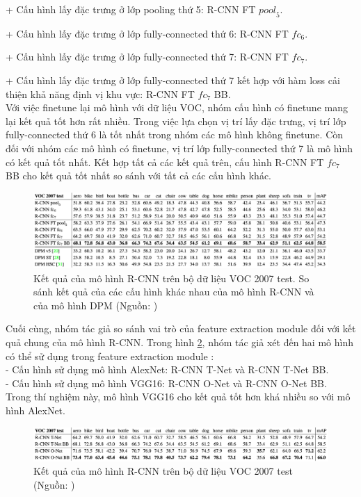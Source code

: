 {    + Cấu hình lấy đặc trưng ở lớp pooling thứ 5: R-CNN FT ${pool}_{5}$. \par
    + Cấu hình lấy đặc trưng ở lớp fully-connected thứ 6: R-CNN FT ${fc}_{6}$. \par
    + Cấu hình lấy đặc trưng ở lớp fully-connected thứ 7: R-CNN FT ${fc}_{7}$. \par
    + Cấu hình lấy đặc trưng ở lớp fully-connected thứ 7 kết hợp với hàm loss cải thiện khả năng định vị khu vực: R-CNN FT ${fc}_{7}$ BB. \\
    Với việc finetune lại mô hình với dữ liệu VOC, nhóm cấu hình có finetune mang lại kết quả tốt hơn rất nhiều.
    Trong việc lựa chọn vị trí lấy đặc trưng, vị trí lớp fully-connected thứ 6 là tốt nhất trong nhóm các mô hình không finetune.
    Còn đối với nhóm các mô hình có finetune, vị trí lớp fully-connected thứ 7 là mô hình có kết quả tốt nhất.
    Kết hợp tất cả các kết quả trên, cấu hình R-CNN FT ${fc}_{7}$ BB cho kết quả tốt nhất so sánh với tất cả các cấu hình khác.
    \begin{figure}[H]
        \centering
        \includegraphics[width=15cm] {images/rcnn_results_1}
        \caption{Kết quả của mô hình R-CNN trên bộ dữ liệu VOC 2007 test. So sánh kết quả của các cấu hình khác nhau của mô hình R-CNN và của mô hình DPM (Nguồn: \cite{girshick2014rich})}
        \label{fig:rcnn_results_1}
    \end{figure}
    \noindent
    Cuối cùng, nhóm tác giả so sánh vai trò của feature extraction module  đối với kết quả chung của mô hình R-CNN.
    Trong hình \ref{fig:rcnn_results_2}, nhóm tác giả xét đến hai mô hình có thể sử dụng trong feature extraction module : \\
    - Cấu hình sử dụng mô hình AlexNet: R-CNN T-Net và R-CNN T-Net BB. \\
    - Cấu hình sử dụng mô hình VGG16: R-CNN O-Net và R-CNN O-Net BB. \\
    Trong thí nghiệm này, mô hình VGG16 cho kết quả tốt hơn khá nhiều so với mô hình AlexNet.
    \begin{figure}[H]
        \centering
        \includegraphics[width=15cm] {images/rcnn_results_2}
        \caption{Kết quả của mô hình R-CNN trên bộ dữ liệu VOC 2007 test (Nguồn: \cite{girshick2014rich})}
        \label{fig:rcnn_results_2}
    \end{figure}

}
